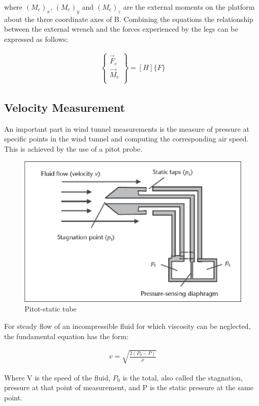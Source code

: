 where $(M_e)_x$, $(M_e)_y$ and $(M_e)_z$ are the external moments on the platform  about the three coordinate axes of B. Combining the equations the relationship between the external wrench and the forces experienced by the legs can be expressed as follows:
\begin{ceqn}
\begin{align}
	\begin{Bmatrix}
		\vec{F}_e \\
		\vec{M}_e \\
	\end{Bmatrix} = [H]\{F\}
\end{align}
\end{ceqn}

 
\subsection{Velocity Measurement}
An important part in wind tunnel measurements is the measure of pressure at specific points in the wind tunnel and computing the corresponding air speed. This is achieved by the use of a pitot probe. 
\begin{center}
\begin{figure}[H]
\centering
\includegraphics[width=0.6\linewidth]{Figures/pitot}
\caption[Pitot-static tube]{Pitot-static tube \cite{viquerat_continuous_2006}}
\end{figure}
\end{center}
For steady flow of an incompressible fluid for which viscosity can be neglected, the fundamental equation has the form:

\begin{ceqn}
	\begin{align}
	v = \sqrt{\frac{2(P_{0} - P)}{\rho}}
\end{align}
\end{ceqn}

Where V is the speed of the fluid, $P_{0}$ is the total, also called the stagnation, pressure at that point of measurement, and P is the static pressure at the same point.

